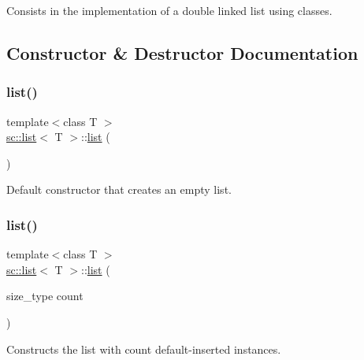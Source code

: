Consists in the implementation of a double linked list using classes. 



\subsection{Constructor \& Destructor Documentation}
\mbox{\label{classsc_1_1list_ac7b95807230114dc58f2b1156cb3cdba}} 
\subsubsection{\texorpdfstring{list()}{list()}\hspace{0.1cm}{\footnotesize\ttfamily [1/5]}}
{\footnotesize\ttfamily template$<$class T $>$ \\
\mbox{\hyperlink{classsc_1_1list}{sc\+::list}}$<$ T $>$\+::\mbox{\hyperlink{classsc_1_1list}{list}} (\begin{DoxyParamCaption}{ }\end{DoxyParamCaption})}



Default constructor that creates an empty list. 

\mbox{\label{classsc_1_1list_a38c946e7fe092c01ea0c0fc3be19d11c}} 
\subsubsection{\texorpdfstring{list()}{list()}\hspace{0.1cm}{\footnotesize\ttfamily [2/5]}}
{\footnotesize\ttfamily template$<$class T $>$ \\
\mbox{\hyperlink{classsc_1_1list}{sc\+::list}}$<$ T $>$\+::\mbox{\hyperlink{classsc_1_1list}{list}} (\begin{DoxyParamCaption}\item[{size\+\_\+type}]{count }\end{DoxyParamCaption})\hspace{0.3cm}{\ttfamily [explicit]}}



Constructs the list with {\ttfamily count} default-\/inserted instances. 

\mbox{\label{classsc_1_1list_a3e0d4a870300bac8315d92b59463a7eb}} 
